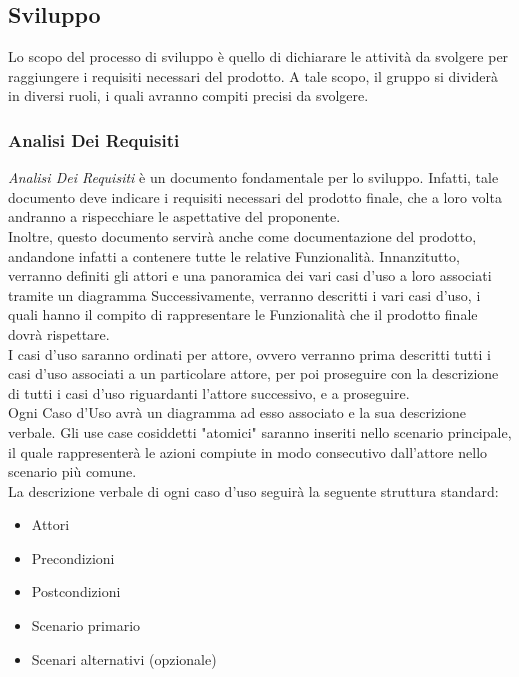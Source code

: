 \subsection{Sviluppo}
Lo scopo del processo di sviluppo è quello di dichiarare le attività da svolgere per raggiungere i requisiti necessari del prodotto.
A tale scopo, il gruppo si dividerà in diversi ruoli, i quali avranno compiti precisi da svolgere.
\subsubsection{Analisi Dei Requisiti}
\textit{Analisi Dei Requisiti} è un documento fondamentale per lo sviluppo. Infatti, tale documento deve indicare i requisiti necessari del prodotto finale, che a loro volta andranno a rispecchiare le aspettative del proponente. \\
Inoltre, questo documento servirà anche come documentazione del prodotto, andandone infatti a contenere tutte le relative Funzionalità.
Innanzitutto, verranno definiti gli attori e una panoramica dei vari casi d'uso a loro associati tramite un diagramma
Successivamente, verranno descritti i vari casi d'uso, i quali hanno il compito di rappresentare le Funzionalità che il prodotto finale dovrà rispettare. \\
I casi d'uso saranno ordinati per attore, ovvero verranno prima descritti tutti i casi d'uso associati a un particolare attore, per poi proseguire con la descrizione di tutti i casi d'uso riguardanti l'attore successivo, e a proseguire. \\
Ogni Caso d'Uso avrà un diagramma ad esso associato e la sua descrizione verbale. Gli use case cosiddetti "atomici" saranno inseriti nello scenario principale, il quale rappresenterà le azioni compiute in modo consecutivo dall'attore nello scenario più comune. \\
La descrizione verbale di ogni caso d'uso seguirà la seguente struttura standard:
\begin{itemize}
    \item Attori
    \item Precondizioni
    \item Postcondizioni
    \item Scenario primario
    \item Scenari alternativi (opzionale)
\end{itemize}
